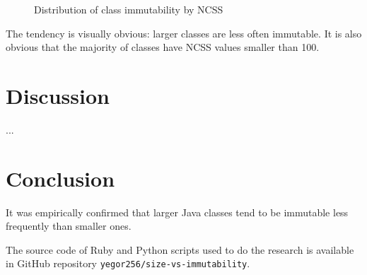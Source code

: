 \documentclass[12pt]{article}
\begin{document}
\begin{figure}[h]
  
  \caption{Distribution of class immutability by NCSS}
  \label{fig:1}
\end{figure}

The tendency is visually obvious: larger classes are less often immutable. It
is also obvious that the majority of classes have NCSS values smaller than 100.

\section{Discussion}

...

\section{Conclusion}

It was empirically confirmed that larger Java classes tend to be immutable
less frequently than smaller ones.

The source code of Ruby and Python scripts used to do the research
is available in GitHub repository \texttt{yegor256/size-vs-immutability}.


\end{document}

